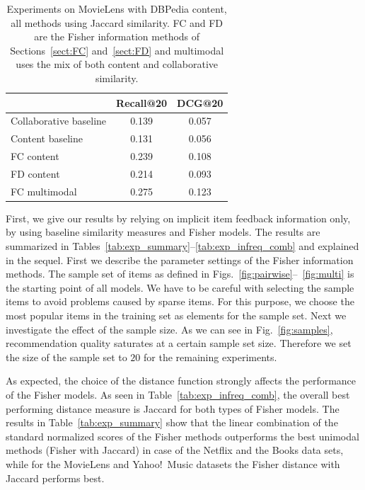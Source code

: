 \documentclass[preprint]{sig-alternate-05-2015}
\begin{document}
\begin{table} 
\caption[]{Experiments on MovieLens with DBPedia content, all methods using Jaccard similarity.  FC and FD are the Fisher information methods of Sections~\ref{sect:FC} and~\ref{sect:FD} and multimodal uses the mix of both content and collaborative similarity.}
\centering
    \begin{tabular}{lcc}
			& Recall@20 	& DCG@20 \\ \hline
Collaborative baseline	& 0.139		& 0.057 \\
Content baseline      	& 0.131 	& 0.056 \\
FC content 		& 0.239 	& 0.108 \\
FD content		& 0.214 	& 0.093 \\
FC multimodal    	& 0.275 	& 0.123 \\ \hline 
    \end{tabular}
      \label{tab:exp_content}
\end{table}

First, we give our results by relying on implicit item feedback information only, by using baseline similarity measures and Fisher models.  The results are summarized in Tables~\ref{tab:exp_summary}--\ref{tab:exp_infreq_comb} and explained in the sequel.
First we describe the parameter settings of the Fisher information methods.
The sample set of items as defined in Figs.~\ref{fig:pairwise}--~\ref{fig:multi} is the starting point of all models.
We have to be careful with selecting the sample items to avoid problems caused by sparse items.  For this purpose, we choose the most popular items in the training set as elements for the sample set.
Next  we investigate the effect of the sample size.
As we can see in Fig.~\ref{fig:samples}, recommendation quality saturates at a certain sample set size. Therefore we set the size of the sample set to $20$ for the remaining experiments. 

As expected, the choice of the distance function strongly affects the performance of the Fisher models. As seen in Table~\ref{tab:exp_infreq_comb}, the overall best performing distance measure is Jaccard for both types of Fisher models. 
The results in Table~\ref{tab:exp_summary} show that the linear combination of the standard normalized scores of the Fisher methods outperforms the best unimodal methods (Fisher with Jaccard) in 
case of the Netflix and the Books data sets, while for the MovieLens and Yahoo!\ Music datasets the Fisher distance with Jaccard performs best. 
\end{document}
